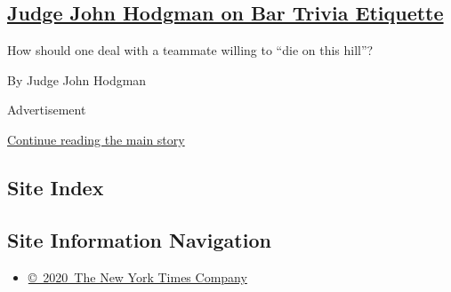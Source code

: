 \begin{enumerate}
  \hypertarget{judge-john-hodgman-on-bar-trivia-etiquette}{%
  \subsection{\texorpdfstring{\href{/2019/11/21/magazine/judge-john-hodgman-on-bar-trivia-etiquette.html}{Judge
  John Hodgman on Bar Trivia
  Etiquette}}{Judge John Hodgman on Bar Trivia Etiquette}}\label{judge-john-hodgman-on-bar-trivia-etiquette}}

  How should one deal with a teammate willing to ``die on this hill''?

  By Judge John Hodgman
\end{enumerate}

Advertisement

\protect\hyperlink{after-mid1}{Continue reading the main story}

\hypertarget{site-index}{%
\subsection{Site Index}\label{site-index}}

\hypertarget{site-information-navigation}{%
\subsection{Site Information
Navigation}\label{site-information-navigation}}

\begin{itemize}
\tightlist
\item
  \href{https://help.nytimes3xbfgragh.onion/hc/en-us/articles/115014792127-Copyright-notice}{©~2020~The
  New York Times Company}
\end{itemize}

